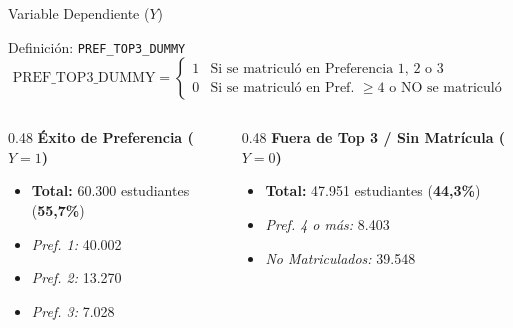 \documentclass[10pt, aspectratio=169, xcolor=table]{beamer}
\begin{document}
\begin{frame}{Variable Dependiente ($Y$)}
  \begin{block}{Definición: \texttt{PREF\_TOP3\_DUMMY}}
    \[
      \text{PREF\_TOP3\_DUMMY} =
      \begin{cases}
      1 & \text{Si se matriculó en Preferencia 1, 2 o 3} \\
      0 & \text{Si se matriculó en Pref. } \ge 4 \text{ o NO se matriculó}
      \end{cases}
    \]
  \end{block}

  \vspace{0.3cm}

  \begin{columns}[t]
    \begin{column}{0.48\textwidth}
      \centering
      \textbf{\textcolor{USACHTeal}{Éxito de Preferencia ($Y = 1$)}}
      \begin{itemize}
        \item \textbf{Total:} 60.300 estudiantes (\textbf{55,7\%})
        \item \textit{Pref. 1:} 40.002
        \item \textit{Pref. 2:} 13.270
        \item \textit{Pref. 3:} 7.028
      \end{itemize}
    \end{column}

    \begin{column}{0.48\textwidth}
      \centering
      \textbf{\textcolor{USACHOrange}{Fuera de Top 3 / Sin Matrícula ($Y = 0$)}}
      \begin{itemize}
        \item \textbf{Total:} 47.951 estudiantes (\textbf{44,3\%})
        \item \textit{Pref. 4 o más:} 8.403
        \item \textit{No Matriculados:} 39.548
      \end{itemize}
    \end{column}
  \end{columns}
\end{frame}
\end{document}

